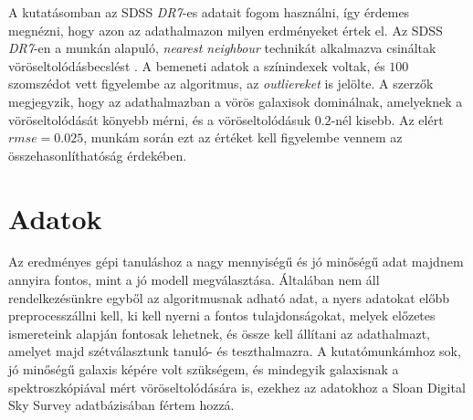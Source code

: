 \documentclass[12pt,letterpaper,oneside,openright]{book}
\begin{document}
 \newline\indent
 A kutatásomban az SDSS \textit{DR7}-es adatait fogom használni, így érdemes megnézni, hogy azon az adathalmazon milyen erdményeket értek el. Az SDSS \textit{DR7}-en a \cite{mlrstwo} munkán alapuló, \textit{nearest neighbour} technikát alkalmazva csináltak vöröseltolódásbecslést \cite{sdss7}. A bemeneti adatok a színindexek voltak, és $100$ szomszédot vett figyelembe az algoritmus, az \textit{outliereket} is jelölte. A szerzők megjegyzik, hogy az adathalmazban a vörös galaxisok dominálnak, amelyeknek a vöröseltolódását könyebb mérni, és a vöröseltolódásuk $0.2$-nél kisebb. Az elért $\textit{rmse} = 0.025$, munkám során ezt az értéket kell figyelembe vennem az összehasonlíthatóság érdekében.
 
 
 
 
 
 
 
 
  \chapter{Adatok}
 Az eredményes gépi tanuláshoz a nagy mennyiségű és jó minőségű adat majdnem annyira fontos, mint a jó modell megválasztása. Általában nem áll  rendelkezésünkre egyből az algoritmusnak adható adat, a nyers adatokat előbb preprocesszállni kell, ki kell nyerni a fontos tulajdonságokat, melyek előzetes ismereteink alapján fontosak lehetnek, és össze kell állítani az adathalmazt, amelyet majd  szétválasztunk tanuló- és teszthalmazra. 
 \newline \indent 
 A kutatómunkámhoz sok, jó minőségű galaxis képére volt szükségem, és mindegyik galaxisnak a spektroszkópiával mért vöröseltolódására is, ezekhez az adatokhoz a Sloan Digital Sky Survey adatbázisában fértem hozzá. 
\end{document}
